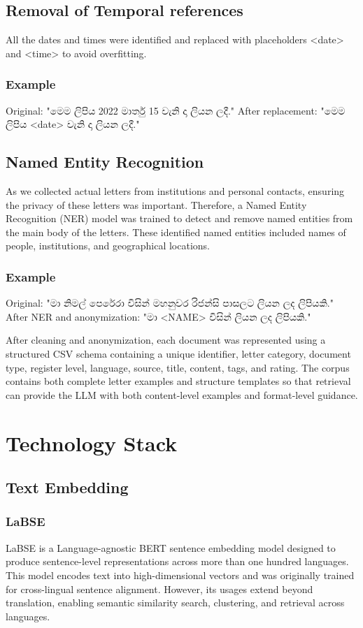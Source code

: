 \documentclass[12pt]{uomthesis}
\newcommand{\si}[1]{{\sinhalafont #1}}
\begin{document}
\subsection{Removal of Temporal references}
All the dates and times were identified and replaced with placeholders <date> and <time> to avoid overfitting. 

\subsubsection{Example} 
Original: "\si{මෙම ලිපිය} 2022 \si{මාර්තු} 15 \si{වැනි දා ලියන ලදී.}" 
After replacement: "\si{මෙම ලිපිය} <date> \si{වැනි දා ලියන ලදී.}"

\subsection{Named Entity Recognition}
As we collected actual letters from institutions and personal contacts, ensuring the privacy of these letters was important. Therefore, a Named Entity Recognition (NER) model was trained to detect and remove named entities from the main body of the letters. These identified named entities included names of people, institutions, and geographical locations.

\subsubsection{Example}
Original: "\si{මා නිමල් පෙරේරා විසින් මහනුවර රිජන්සි පාසලට ලියන ලද ලිපියකි.}" 
After NER and anonymization: "\si{මා} <NAME> \si{විසින් ලියන ලද ලිපියකි.}"

After cleaning and anonymization, each document was represented using a structured CSV schema containing a unique identifier, letter category, document type, register level, language, source, title, content, tags, and rating. The corpus contains both complete letter examples and structure templates so that retrieval can provide the LLM with both content-level examples and format-level guidance.

\section{Technology Stack}

\subsection{Text Embedding}

\subsubsection{LaBSE}
LaBSE is a Language-agnostic BERT sentence embedding model designed to produce sentence-level representations across more than one hundred languages. This model encodes text into high-dimensional vectors and was originally trained for cross-lingual sentence alignment. However, its usages extend beyond translation, enabling semantic similarity search, clustering, and retrieval across languages.
\end{document}

